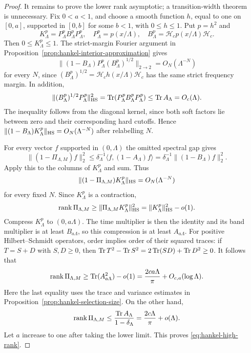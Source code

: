 \begin{proof}
It remains to prove the lower rank asymptotic; a transition-width
theorem is unnecessary. Fix $0<a<1$, and choose a smooth function
$h$, equal to one on $[0,a]$, supported in $[0,b]$ for some $b<1$,
with $0\leq h\leq1$. Put $p=h^2$ and
\[
 K^p_\Lambda=P^p_\Lambda B^p_\Lambda P^p_\Lambda,
 \quad P^p_\Lambda=p(x/\Lambda),
 \quad B^p_\Lambda=\mathcal H_cp(x/\Lambda)\mathcal H_c.
\]
Then $0\leq K^p_\Lambda\leq1$. The strict-margin Fourier argument
in Proposition~\ref{prop:hankel-interior-approximation} gives
\[
 \|(1-B_\Lambda)P^p_\Lambda(B^p_\Lambda)^{1/2}\|_{2\to2}
                                         =O_N(\Lambda^{-N})
\]
for every $N$, since $(B^p_\Lambda)^{1/2}
=\mathcal H_ch(x/\Lambda)\mathcal H_c$ has the same strict
frequency margin. In addition,
\[
 \|(B^p_\Lambda)^{1/2}P^p_\Lambda\|_{\rm HS}^2
    =\operatorname{Tr}(P^p_\Lambda B^p_\Lambda P^p_\Lambda)
    \leq\operatorname{Tr} A_\Lambda=O_c(\Lambda).
\]
The inequality follows from the diagonal kernel, since both
soft factors lie between zero and their corresponding hard
cutoffs. Hence
$\|(1-B_\Lambda)K^p_\Lambda\|_{\rm HS}=O_N(\Lambda^{-N})$
after relabelling $N$.

For every vector $f$ supported in $(0,\Lambda)$ the omitted
spectral gap gives
\begin{equation}
 \label{eq:high-projection-gap}
 \|(1-\Pi_{\Lambda,M})f\|_2^2
 \leq\delta_\Lambda^{-1}\langle f,(1-A_\Lambda)f\rangle
 =\delta_\Lambda^{-1}\|(1-B_\Lambda)f\|_2^2.
\end{equation}
Apply this to the columns of $K^p_\Lambda$ and sum. Thus
\begin{equation}
 \label{eq:high-soft-HS}
 \|(1-\Pi_{\Lambda,M})K^p_\Lambda\|_{\rm HS}
                                      =O_N(\Lambda^{-N})
\end{equation}
for every fixed $N$. Since $K^p_\Lambda$ is a contraction,
\[
 \operatorname{rank}\Pi_{\Lambda,M}
 \geq\|\Pi_{\Lambda,M}K^p_\Lambda\|_{\rm HS}^2
 =\|K^p_\Lambda\|_{\rm HS}^2-o(1).
\]
Compress $K^p_\Lambda$ to $(0,a\Lambda)$. The time multiplier is
then the identity and its band multiplier is at least
$B_{a\Lambda}$, so this compression is at least $A_{a\Lambda}$.
For positive Hilbert--Schmidt operators, order implies order of
their squared traces: if $T=S+D$ with $S,D\geq0$, then
$\operatorname{Tr} T^2-\operatorname{Tr} S^2=2\operatorname{Tr}(SD)+\operatorname{Tr} D^2\geq0$.
It follows that
\[
 \operatorname{rank}\Pi_{\Lambda,M}
 \geq\operatorname{Tr}(A_{a\Lambda}^2)-o(1)
 =\frac{2ca\Lambda}{\pi}+O_{c,a}(\log\Lambda).
\]
Here the last equality uses the trace and variance estimates in
Proposition~\ref{prop:hankel-selection-size}.
On the other hand,
\[
 \operatorname{rank}\Pi_{\Lambda,M}
       \leq\frac{\operatorname{Tr} A_\Lambda}{1-\delta_\Lambda}
       =\frac{2c\Lambda}{\pi}+o(\Lambda).
\]
Let $a$ increase to one after taking the lower limit. This proves
\eqref{eq:hankel-high-rank}.
\end{proof}

